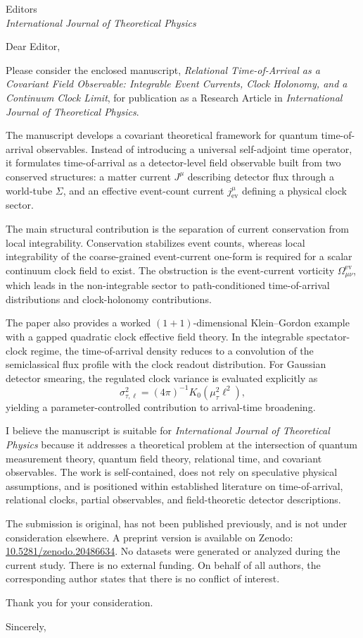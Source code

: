 \documentclass[a4paper,10pt]{letter}
\date{\today}
\begin{document}
    
    \begin{letter}{Editors\\ \textit{International Journal of Theoretical Physics}}

\opening{Dear Editor,}

Please consider the enclosed manuscript,
\textit{Relational Time-of-Arrival as a Covariant Field Observable: Integrable Event Currents, Clock Holonomy, and a Continuum Clock Limit},
for publication as a Research Article in \textit{International Journal of Theoretical Physics}.

The manuscript develops a covariant theoretical framework for quantum time-of-arrival observables. Instead of introducing a universal self-adjoint time operator, it formulates time-of-arrival as a detector-level field observable built from two conserved structures: a matter current $J^\mu$ describing detector flux through a world-tube $\Sigma$, and an effective event-count current $j^\mu_{\mathrm{ev}}$ defining a physical clock sector.

The main structural contribution is the separation of current conservation from local integrability. Conservation stabilizes event counts, whereas local integrability of the coarse-grained event-current one-form is required for a scalar continuum clock field to exist. The obstruction is the event-current vorticity $\Omega^{\mathrm{ev}}_{\mu\nu}$, which leads in the non-integrable sector to path-conditioned time-of-arrival distributions and clock-holonomy contributions.

The paper also provides a worked $(1+1)$-dimensional Klein--Gordon example with a gapped quadratic clock effective field theory. In the integrable spectator-clock regime, the time-of-arrival density reduces to a convolution of the semiclassical flux profile with the clock readout distribution. For Gaussian detector smearing, the regulated clock variance is evaluated explicitly as
\[
    \sigma_{\tau,\ell}^{2} = (4\pi)^{-1} K_0(\mu_\tau^2 \ell^2),
\]
yielding a parameter-controlled contribution to arrival-time broadening.

I believe the manuscript is suitable for \textit{International Journal of Theoretical Physics} because it addresses a theoretical problem at the intersection of quantum measurement theory, quantum field theory, relational time, and covariant observables. The work is self-contained, does not rely on speculative physical assumptions, and is positioned within established literature on time-of-arrival, relational clocks, partial observables, and field-theoretic detector descriptions.

The submission is original, has not been published previously, and is not under consideration elsewhere. A preprint version is available on Zenodo:
\href{https://doi.org/10.5281/zenodo.20486634}{10.5281/zenodo.20486634}.
No datasets were generated or analyzed during the current study. There is no external funding. On behalf of all authors, the corresponding author states that there is no conflict of interest.

Thank you for your consideration.

\closing{Sincerely,}
    
    \end{letter}
\end{document}
